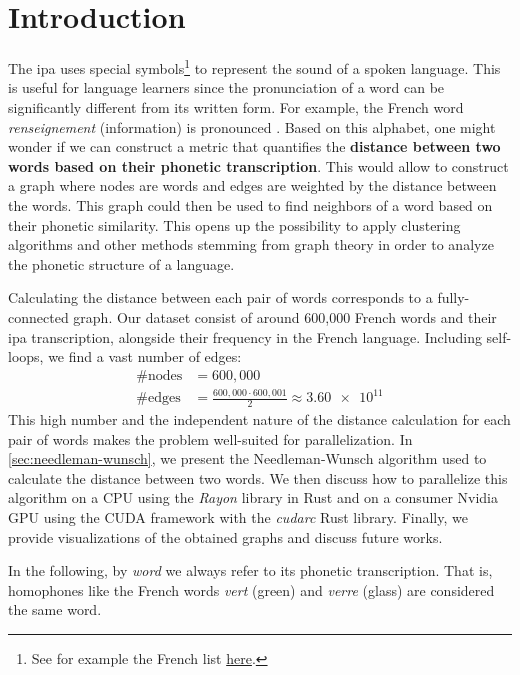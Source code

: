 \section{Introduction}

The \gls{ipa} uses special symbols\footnote{See for example the French list \href{https://en.wikipedia.org/wiki/Help:IPA/French}{here}.} to represent the sound of a spoken language. This is useful for language learners since the pronunciation of a word can be significantly different from its written form. For example, the French word \textit{renseignement} (information) is pronounced . Based on this alphabet, one might wonder if we can construct a metric that quantifies the \textbf{distance between two words based on their phonetic transcription}. This would allow to construct a graph where nodes are words and edges are weighted by the distance between the words. This graph could then be used to find neighbors of a word based on their phonetic similarity. This opens up the possibility to apply clustering algorithms and other methods stemming from graph theory in order to analyze the phonetic structure of a language.

Calculating the distance between each pair of words corresponds to a fully-connected graph. Our dataset consist of around 600,000 French words and their \gls{ipa} transcription, alongside their frequency in the French language. Including self-loops, we find a vast number of edges:
\begin{align}
    \text{\#nodes} &= 600,000 \\
    \text{\#edges} &= \frac{600,000 \cdot 600,001}{2} \approx \num{3.60e11}
\end{align}
This high number and the independent nature of the distance calculation for each pair of words makes the problem well-suited for parallelization. In \autoref{sec:needleman-wunsch}, we present the Needleman-Wunsch algorithm used to calculate the distance between two words. We then discuss how to parallelize this algorithm on a CPU using the \textit{Rayon} library in Rust and on a consumer Nvidia GPU using the CUDA framework with the \textit{cudarc} Rust library. Finally, we provide visualizations of the obtained graphs and discuss future works.

In the following, by \textit{word} we always refer to its phonetic transcription. That is, homophones like the French words \textit{vert}  (green) and \textit{verre}  (glass) are considered the same word.

